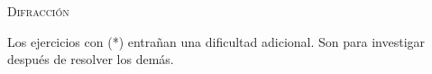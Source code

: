 \documentclass[11pt, spanish, a4paper, twoside]{article}
\begin{document}
\begin{center}
	\textsc{\LARGE Difracción}
\end{center}

Los ejercicios con (*) entrañan una dificultad adicional. Son para investigar después de resolver los demás.


\begin{enumerate}





\end{enumerate}
\end{document}
